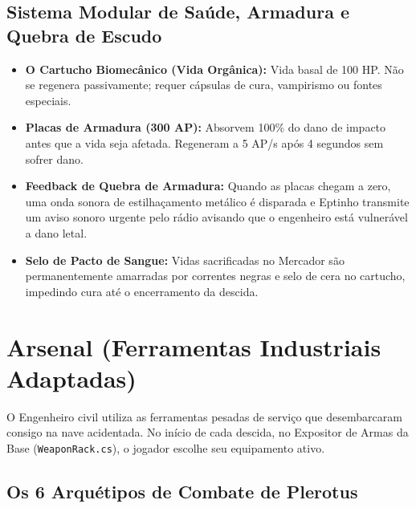 \documentclass[a4paper,12pt]{report}
\begin{document}
\section{Sistema Modular de Saúde, Armadura e Quebra de Escudo}
\begin{itemize}
    \item \textbf{O Cartucho Biomecânico (Vida Orgânica):} Vida basal de 100 HP. Não se regenera passivamente; requer cápsulas de cura, vampirismo ou fontes especiais.
    \item \textbf{Placas de Armadura (300 AP):} Absorvem 100\% do dano de impacto antes que a vida seja afetada. Regeneram a 5 AP/s após 4 segundos sem sofrer dano.
    \item \textbf{Feedback de Quebra de Armadura:} Quando as placas chegam a zero, uma onda sonora de estilhaçamento metálico é disparada e Eptinho transmite um aviso sonoro urgente pelo rádio avisando que o engenheiro está vulnerável a dano letal.
    \item \textbf{Selo de Pacto de Sangue:} Vidas sacrificadas no Mercador são permanentemente amarradas por correntes negras e selo de cera no cartucho, impedindo cura até o encerramento da descida.
\end{itemize}

\chapter{Arsenal (Ferramentas Industriais Adaptadas)}\label{cap:arsenal}

O Engenheiro civil utiliza as ferramentas pesadas de serviço que desembarcaram consigo na nave acidentada. No início de cada descida, no Expositor de Armas da Base (\texttt{WeaponRack.cs}), o jogador escolhe seu equipamento ativo.

\section{Os 6 Arquétipos de Combate de Plerotus}
\end{document}
